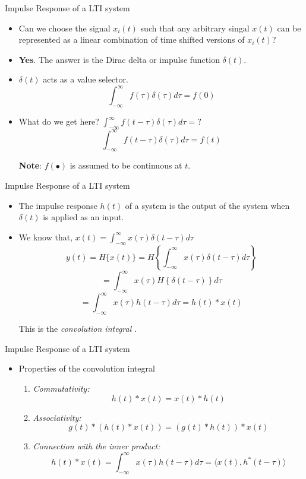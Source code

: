 \documentclass{beamer}
\begin{document}
\begin{frame}{Impulse Response of a LTI system}

\begin{itemize}
\item Can we choose the signal $x_i(t)$ such that any arbitrary singal $x(t)$ can be represented as a linear combination of time shifted versions of $x_i(t)$?
\pause
\item \textbf{Yes}. The answer is the Dirac delta or impulse function $\delta(t)$.
\pause
\item $\delta(t)$ acts as a value selector. 
\[ \int_{-\infty}^{\infty}f(\tau)\delta(\tau)d\tau = f(0) \]
\pause
\item What do we get here? $\int_{-\infty}^{\infty}f(t-\tau)\delta(\tau)d\tau = ?$
\pause
\[ \int_{-\infty}^{\infty}f(t-\tau)\delta(\tau)d\tau = f(t) \]

\textbf{Note}: $f(\bullet)$ is assumed to be continuous at $t$. 
\end{itemize}

\end{frame}

\begin{frame}{Impulse Response of a LTI system}

\begin{itemize}
\item The impulse response $h(t)$ of a system is the output of the system when $\delta(t)$ is applied as an input.
\item We know that, $x(t) = \int_{-\infty}^{\infty} x(\tau) \delta(t - \tau)d\tau$
\[ y(t) = H\{x(t)\} = H\left\{\int_{-\infty}^{\infty}x(\tau)\delta(t - \tau)d\tau \right\} \]
\[ = \int_{-\infty}^{\infty}x(\tau)H\left\{\delta(t - \tau)\right\}d\tau \]
\[= \int_{-\infty}^{\infty}x(\tau)h(t - \tau)d\tau = h(t) * x(t) \]

This is the \textit{convolution integral} .

\end{itemize}

\end{frame}

\begin{frame}{Impulse Response of a LTI system}

\begin{itemize}      
\item Properties of the convolution integral
\begin{enumerate}
\item \textit{Commutativity:} 
\[ h(t) * x(t) = x(t) * h(t) \]
\item \textit{Associativity:} 
\[ g(t) * (h(t) * x(t)) = (g(t) * h(t)) * x(t) \]
\item \textit{Connection with the inner product:} 
\[ h(t) * x(t) = \int_{-\infty}^{\infty}x(\tau)h(t - \tau)d\tau = \langle x(t), h^*(t - \tau) \rangle\]
\end{enumerate}
\end{itemize}
\end{frame}
\end{document}
